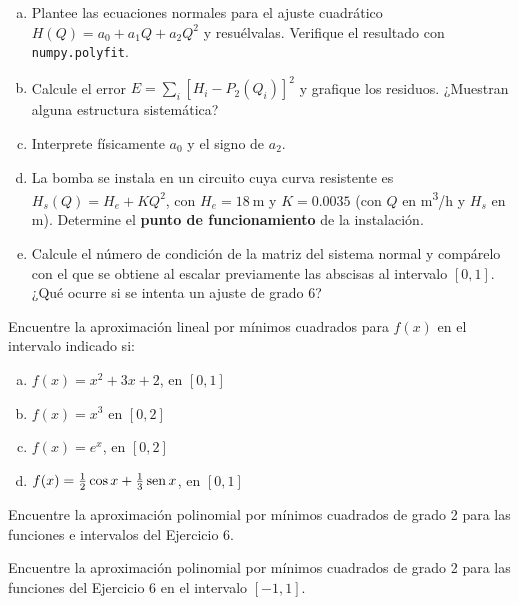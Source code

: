 \documentclass[11pt]{article}
\begin{document}
\begin{question}
	\begin{enumerate}[a)]
		\item Plantee las ecuaciones normales para el ajuste cuadrático $H(Q) = a_0 + a_1 Q + a_2 Q^2$ y resuélvalas. Verifique el resultado con \texttt{numpy.polyfit}.
		\item Calcule el error $E = \sum_i [H_i - P_2(Q_i)]^2$ y grafique los residuos. ¿Muestran alguna estructura sistemática?
		\item Interprete físicamente $a_0$ y el signo de $a_2$.
		\item La bomba se instala en un circuito cuya curva resistente es $H_s(Q) = H_e + K Q^2$, con $H_e = \qty{18}{\metre}$ y $K = \num{0.0035}$ (con $Q$ en \unit[per-mode=symbol]{\cubic\metre\per\hour} y $H_s$ en \unit{\metre}). Determine el \textbf{punto de funcionamiento} de la instalación.
		\item Calcule el número de condición de la matriz del sistema normal y compárelo con el que se obtiene al escalar previamente las abscisas al intervalo $[0, 1]$. ¿Qué ocurre si se intenta un ajuste de grado 6?
	\end{enumerate}
\end{question}

\begin{question} %
	Encuentre la aproximación lineal por mínimos cuadrados para $f(x)$ en el intervalo indicado si:
	\begin{enumerate}[a)]
		\item $f(x) = x^2 + 3 x + 2$, en $[0, 1]$
		\item $f(x) = x^3$ en $[0, 2]$
		\item $f(x) = e^x$, en $[0, 2]$
		\item $f(x) = \frac{1}{2} \cos x + \frac{1}{3} \operatorname{sen} x$, en $[0, 1]$
	\end{enumerate}
\end{question}

\begin{question} %
	Encuentre la aproximación polinomial por mínimos cuadrados de grado 2 para las funciones e intervalos del Ejercicio 6.
\end{question}

\begin{question} %
	Encuentre la aproximación polinomial por mínimos cuadrados de grado 2 para las funciones del Ejercicio 6 en el intervalo $[-1, 1]$.
\end{question}
\end{document}
